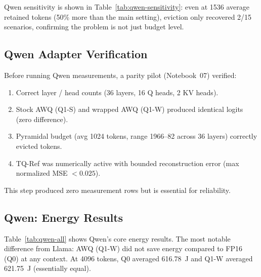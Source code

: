 \documentclass[sigconf,nonacm]{acmart}
\begin{document}
Qwen sensitivity is shown in Table~\ref{tab:qwen-sensitivity}: even at 1536
average retained tokens (50\% more than the main setting), eviction only recovered
2/15 scenarios, confirming the problem is not just budget level.

\subsection{Qwen Adapter Verification}
\label{sec:adapter}

Before running Qwen measurements, a parity pilot (Notebook~07) verified:
\begin{enumerate}
  \item Correct layer / head counts (36 layers, 16 Q heads, 2 KV heads).
  \item Stock AWQ (Q1-S) and wrapped AWQ (Q1-W) produced identical logits (zero
    difference).
  \item Pyramidal budget (avg 1024 tokens, range 1966--82 across 36 layers)
    correctly evicted tokens.
  \item TQ-Ref was numerically active with bounded reconstruction error
    (max normalized MSE $< 0.025$).
\end{enumerate}

This step produced zero measurement rows but is essential for reliability.

\subsection{Qwen: Energy Results}
\label{sec:qwen-energy}

Table~\ref{tab:qwen-all} shows Qwen's core energy results. The most notable
difference from Llama: AWQ (Q1-W) did not save energy compared to FP16 (Q0) at
any context. At 4096 tokens, Q0 averaged 616.78~J and Q1-W averaged 621.75~J
(essentially equal).

\begin{table}[htbp]
\caption{Qwen Energy (J, mean $\pm$ SD) at All Contexts}
\label{tab:qwen-all}
\centering\small
{}
\end{table}
\end{document}
